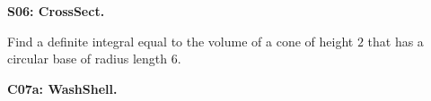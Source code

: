\documentclass[12pt]{article}
\newcommand{\<}{\left\langle}
\renewcommand{\>}{\right\rangle}
\newcommand{\exerciseHeader}[4]{


  \vspace{0.5em}
  \textbf{#2}
  \vspace{0.5em}

}
\begin{document}
\begin{multicols}{2}
%

\exerciseHeader{2017 June 23}{S06: CrossSect.}{
Express an area between curves as a definite integral.
}{3/3}

Find a definite integral equal to the volume of a cone of height
\(2\) that has a circular base of radius length \(6\).



%

%

%
%
%

%
%
%
%
%
%
\exerciseHeader{2017 July 07}{C07a: WashShell.}{
Use the washer or cylindrical shell method to express a volume of
revolution as a definite integral.
}{Extra2}


\end{multicols}
\end{document}
